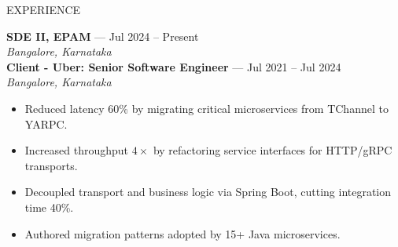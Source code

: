 \documentclass{resume} %
\begin{document}
\begin{rSection}{EXPERIENCE}

\textbf{SDE II, EPAM} --- Jul 2024 -- Present\\
\textit{Bangalore, Karnataka}\\

\textbf{Client - Uber: Senior Software Engineer} --- Jul 2021 -- Jul 2024\\
\textit{Bangalore, Karnataka}\\
\begin{itemize}
    \itemsep -6pt
    \item Reduced latency 60\% by migrating critical microservices from TChannel to YARPC.
    \item Increased throughput $4\times$ by refactoring service interfaces for HTTP/gRPC transports.
    \item Decoupled transport and business logic via Spring Boot, cutting integration time 40\%.
    \item Authored migration patterns adopted by 15+ Java microservices.
\end{itemize}


\end{rSection}
\end{document}
